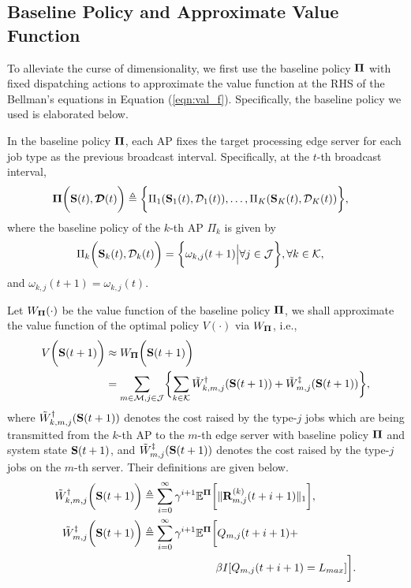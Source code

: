 \subsection{Baseline Policy and Approximate Value Function}
\label{subsec:chapter3-baseline}
To alleviate the curse of dimensionality, we first use the baseline policy $\mathbf{\Pi}$ with fixed dispatching actions to approximate the value function at the RHS of the Bellman's equations in Equation (\ref{eqn:val_f}).
Specifically, the baseline policy we used is elaborated below.

\begin{definition}
    In the baseline policy $\mathbf{\Pi}$, each AP fixes the target processing edge server for each job type as the previous broadcast interval. Specifically, at the $t$-th broadcast interval,
    \begin{align}
        \mathbf{\Pi}\bigg(\mathbf{S}(t),\boldsymbol{\mathcal{D}}(t)\bigg) &\triangleq \bigg\{ 
            \Pi_{1}(\mathbf{S}_{1}(t),\mathcal{D}_{1}(t)),
            \dots,
            \Pi_{K}(\mathbf{S}_{K}(t),\mathcal{D}_{K}(t))
        \bigg\},
    \end{align}
    where the baseline policy of the $k$-th AP $\Pi_k$ is given by 
    \begin{align}
        \Pi_{k}\bigg(\mathbf{S}_{k}(t),\mathcal{D}_{k}(t)\bigg)
        &= \bigg\{
            {\omega}_{k,j}(t+1) \Big| \forall j\in\mathcal{J}
        \bigg\}, \forall k\in\mathcal{K},
    \end{align}
    and $\omega_{k,j}(t+1) = \omega_{k,j}(t)$.
\end{definition}

Let $W_{\mathbf{\Pi}}(\cdot)$ be the value function of the baseline policy $\mathbf{\Pi}$, we shall approximate the value function of the optimal policy $V(\cdot)$ via $W_{\mathbf{\Pi}}$, i.e.,
\begin{align}
    V\Paren{\Stat(t+1)} &\approx W_{\Baseline}\Paren{\Stat(t+1)}
    \nonumber\\
    &= \sum_{m\in\esSet,j\in\jSpace}\Brace{
        \sum_{k\in\apSet} \tilde{W}^{\AP}_{k,m,j}(\Stat(t+1))
        +\tilde{W}^{\ES}_{m,j}(\Stat(t+1))
    },
    \label{eqn:baseline}
\end{align}
where $\tilde{W}^{\dagger}_{k,m,j}(\mathbf{S}(t+1))$ denotes the cost raised by the type-$j$ jobs which are being transmitted from the $k$-th AP to the $m$-th edge server with baseline policy $\mathbf{\Pi}$ and system state $\mathbf{S}(t+1)$, and $\tilde{W}^{\ddagger}_{m,j}(\mathbf{S}(t+1))$ denotes the cost raised by the type-$j$ jobs on the $m$-th server.
Their definitions are given below.
\begin{align}
    \tilde{W}^{\dagger}_{k,m,j} \bigg(\mathbf{S}(t+1)\bigg) &\triangleq
        \sum_{i=0}^{\infty} \gamma^{i+1} \mathbb{E}^{\mathbf{\Pi}}\bigg[
            \lVert\mathbf{R}^{(k)}_{m,j}(t+i+1)\|_1
        \bigg],
    \\    
    \tilde{W}^{\ddagger}_{m,j} \bigg(\mathbf{S}(t+1)\bigg) &\triangleq
        \sum_{i=0}^{\infty} \gamma^{i+1} \mathbb{E}^{\mathbf{\Pi}}\bigg[
            Q_{m,j}(t+i+1) +
            \nonumber\\
            &~~~~~~~~~~~~~~~~~~~~\beta I[Q_{m,j}(t+i+1) = L_{max}]
        \bigg].
\end{align}

